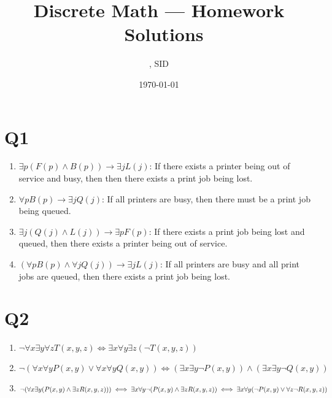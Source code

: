 \documentclass[11pt]{article}
\title{Discrete Math --- Homework \Homework \ Solutions}
\author{\Name, SID \SID}
\date{\today}
\newenvironment{qparts}{\begin{enumerate}[{(}a{)}]}{\end{enumerate}}
\begin{document}
\maketitle

\section*{Q1}
\begin{qparts}
    
    \item $\exists p(F(p)\land B(p)) \to \exists jL(j)$: 
    If there exists a printer being out of service and busy, then 
    then there exists a print job being lost.

    \item $\forall pB(p) \to \exists jQ(j)$: 
    If all printers are busy, then there must be 
    a print job being queued.
    
    \item $\exists j(Q(j)\land L(j))\to \exists pF(p)$: 
    If there exists a print job being lost and queued, then there exists
    a printer being out of service.
    
    \item $(\forall pB(p) \land \forall jQ(j)) \to \exists jL(j)$:
    If all printers are busy and all print jobs are queued, then
    there exists a print job being lost.
\end{qparts}

\section*{Q2}
\begin{qparts}
    
    \item $\lnot \forall x \exists y \forall zT(x,y,z)
    \iff\exists x \forall y \exists z (\lnot T(x,y,z))$

    
    \item $\lnot (\forall x\forall yP(x,y)\lor \forall x\forall yQ(x,y))
    \iff (\exists x\exists y\lnot P(x,y)) \land (\exists x \exists y \lnot Q(x,y))$
    
    \item $\lnot (\forall x \exists y (P(x,y)\land \exists zR(x,y,z))
    )\iff\exists x \forall y \lnot (P(x,y)\land \exists zR(x,y,z))\\
    \iff\exists x \forall y (\lnot P(x,y) \lor \forall z \lnot R(x,y,z))$
\end{qparts}
\end{document}

